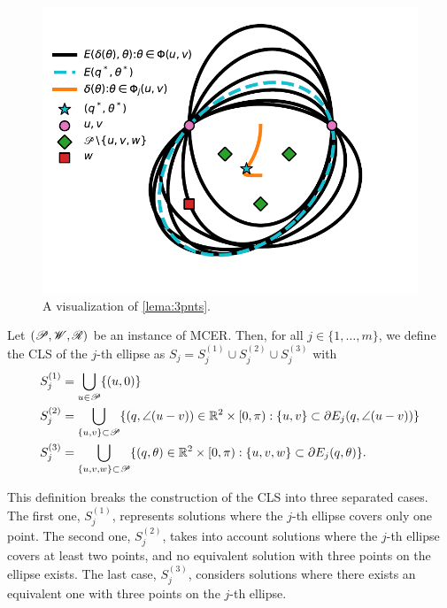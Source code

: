 \begin{figure}[H]
	\centering
	\includegraphics[scale=.7]{figures/lema-3-points}
	\caption{A visualization of \autoref{lema:3pnts}.}
	\label{fig:lema-3-points}
\end{figure}

\begin{definition}\label{def:Sj}
	Let $(\mathscr{P}, \mathscr{W}, \mathscr{R})$ be an instance of MCER. Then, for all $j\in\{1, \dots, m\}$, we define the CLS of the $j$-th ellipse as $S_j = S_j^{(1)} \cup S_j^{(2)} \cup S_j^{(3)}$ with
	\begin{align*}
	S_j^{(1)} &= \bigcup_{u \in \mathscr{P}} \{(u, 0)\}\\
	S_j^{(2)} &= \bigcup_{\{u, v\} \subset \mathscr{P}} \{(q, \angle(u-v))\in \mathbb{R}^2\times[0, \pi): \{u,v\} \subset \partial E_j(q, \angle(u-v))\}\\
	S_j^{(3)} &= \bigcup_{\{u, v, w\} \subset \mathscr{P}} \{(q, \theta)\in \mathbb{R}^2\times[0, \pi): \{u, v, w\} \subset \partial E_j(q, \theta)\}.
	\end{align*}
\end{definition}

This definition breaks the construction of the CLS into three separated cases. The first one, $S_j^{(1)}$, represents solutions where the $j$-th ellipse covers only one point. The second one, $S_j^{(2)}$, takes into account solutions where the $j$-th ellipse covers at least two points, and no equivalent solution with three points on the ellipse exists. The last case, $S_j^{(3)}$, considers solutions where there exists an equivalent one with three points on the $j$-th ellipse. 

